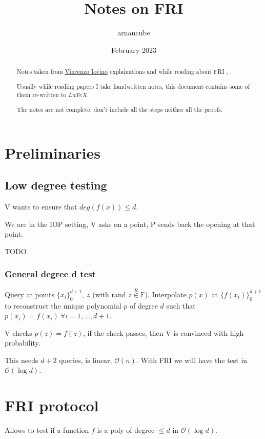 \documentclass{article}
\title{Notes on FRI}
\author{arnaucube}
\date{February 2023}
\theoremstyle{definition}
\begin{document}
\maketitle

\begin{abstract}
	Notes taken from \href{https://sites.google.com/site/vincenzoiovinoit/}{Vincenzo Iovino} explainations and while reading about FRI \cite{fri}, \cite{cryptoeprint:2022/1216}.

	Usually while reading papers I take handwritten notes, this document contains some of them re-written to $LaTeX$.

	The notes are not complete, don't include all the steps neither all the proofs.
\end{abstract}

\tableofcontents

\section{Preliminaries}
\subsection{Low degree testing}
V wants to ensure that $deg(f(x)) \leq d$.

We are in the IOP setting, V asks on a point, P sends back the opening at that point.

TODO

\subsubsection{General degree d test}

Query at points $\{ x_i \}_0^{d+1},~z$ (with rand $z \overset{R}{\in} \mathbb{F}$).
Interpolate $p(x)$ at $\{f(x_i)\}_0^{d+1}$ to reconstruct the unique polynomial $p$ of degree $d$ such that $p(x_i)=f(x_i)~\forall i=1, \ldots, d+1$.

V checks $p(z)=f(z)$, if the check passes, then V is convinced with high probability.

This needs $d+2$ queries, is linear, $\mathcal{O}(n)$. With FRI we will have the test in $\mathcal{O}(\log{}d)$.

\section{FRI protocol}
Allows to test if a function $f$ is a poly of degree $\leq d$ in $\mathcal{O}(\log{}d)$.
\end{document}
